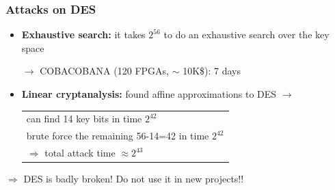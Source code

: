 \documentclass[aspectratio=169, lualatex, 10pt,dvipsnames,svgnames]{beamer} %
\def\enrouge#1{\textcolor{rouge}{#1}}
\begin{document}
\begin{frame}

  \frametitle{Attacks on DES}

  \pause

  \begin{itemize}
  \item {\bf Exhaustive search:} it takes $2^{56}$ to do an exhaustive search over the key space

    $\longrightarrow$ COBACOBANA (120 FPGAs, $\sim$ 10K\$): 7 days 
    \bigskip{}
    \pause

  \item {\bf Linear cryptanalysis:} found affine approximations to DES
    $\longrightarrow$\begin{tabular}[t]{l}
      can find 14 key bits in time $2^{42}$ \\
      brute force the remaining 56-14=42 in time $2^{42}$ \\
      $\Rightarrow$ total attack time $\approx 2^{43}$
    \end{tabular}
  \end{itemize}
  \bigskip{}
  \pause
  
  \enrouge{$\Rightarrow$ DES is badly broken! Do not use it in new projects!!}

\end{frame}
\end{document}
